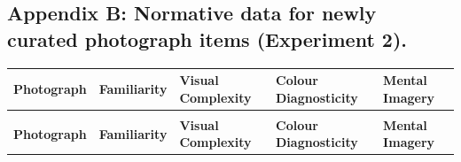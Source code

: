 \documentclass[
  11pt,
]{article}
\begin{document}
\newpage

\hypertarget{appendix-b-normative-data-for-newly-curated-photograph-items-experiment-2.}{%
\subsection{Appendix B: Normative data for newly curated photograph
items (Experiment
2).}\label{appendix-b-normative-data-for-newly-curated-photograph-items-experiment-2.}}

\begingroup\fontsize{10}{12}\selectfont

\begin{longtable}{>{\raggedright\arraybackslash}p{4cm}>{\centering\arraybackslash}p{2cm}>{\centering\arraybackslash}p{2cm}>{\centering\arraybackslash}p{2cm}>{\centering\arraybackslash}p{2cm}}
\toprule
\textbf{Photograph} & \textbf{Familiarity} & \textbf{Visual Complexity} & \textbf{Colour Diagnosticity} & \textbf{Mental Imagery}\\
\midrule
\endfirsthead
\multicolumn{5}{@{}l}{\textit{(continued)}}\\
\toprule
\textbf{Photograph} & \textbf{Familiarity} & \textbf{Visual Complexity} & \textbf{Colour Diagnosticity} & \textbf{Mental Imagery}\\
\midrule
\endhead


\end{longtable}
\end{document}
